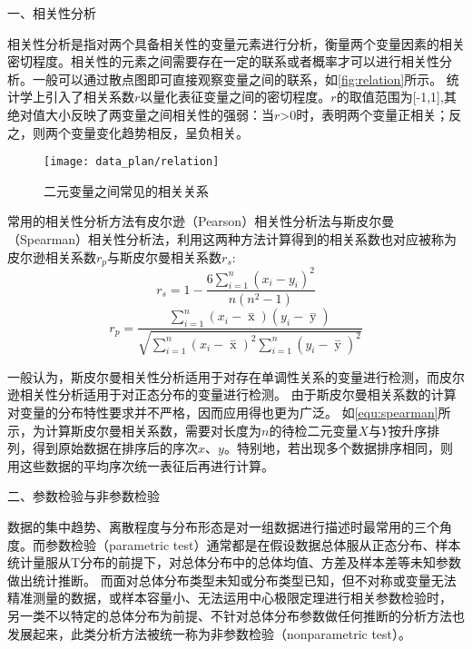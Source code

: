 一、相关性分析

相关性分析是指对两个具备相关性的变量元素进行分析，衡量两个变量因素的相关密切程度\cite{Zhang2019}。相关性的元素之间需要存在一定的联系或者概率才可以进行相关性分析。一般可以通过散点图即可直接观察变量之间的联系，如\autoref{fig:relation}所示。
统计学上引入了相关系数$r$以量化表征变量之间的密切程度。$r$的取值范围为[-1,1],其绝对值大小反映了两变量之间相关性的强弱：当$r$>0时，表明两个变量正相关；反之，则两个变量变化趋势相反，呈负相关。

\begin{figure}[htbp]
      \centering
      \texttt{[image: data\_plan/relation]}
      \caption[二元变量之间常见的相关关系]{\label{fig:relation}二元变量之间常见的相关关系\cite{IXL2022}}
\end{figure}

常用的相关性分析方法有皮尔逊（Pearson）相关性分析法与斯皮尔曼（Spearman）相关性分析法，利用这两种方法计算得到的相关系数也对应被称为皮尔逊相关系数$r_p$与斯皮尔曼相关系数$r_s$:
\begin{equation}
      \label{equ:spearman}
      r_s=1-\frac{6\sum_{i=1}^{n}(x_{i}-y_{i})^2}{n(n^2-1)}
\end{equation}
\begin{equation}
      \label{equ:pearson}
      r_p=\frac{\sum_{i=1}^n{(x_i- \mathop{x} \limits^-)(y_i- \mathop{y} \limits^-)}}{\sqrt{{\sum_{i=1}^n}{{(x_i- \mathop{x} \limits^-)^2\sum_{i=1}^n}{(y_i- \mathop{y} \limits^-)^2}}}}
\end{equation}

一般认为，斯皮尔曼相关性分析适用于对存在单调性关系的变量进行检测，而皮尔逊相关性分析适用于对正态分布的变量进行检测。
由于斯皮尔曼相关系数的计算对变量的分布特性要求并不严格，因而应用得也更为广泛。
如\autoref{equ:spearman}所示，为计算斯皮尔曼相关系数，需要对长度为$n$的待检二元变量$X$与$Y$按升序排列，得到原始数据在排序后的序次$x$、$y$。特别地，若出现多个数据排序相同，则用这些数据的平均序次统一表征后再进行计算。

二、参数检验与非参数检验

数据的集中趋势、离散程度与分布形态是对一组数据进行描述时最常用的三个角度\cite{Hu2021}。而参数检验（parametric test）通常都是在假设数据总体服从正态分布、样本统计量服从T分布的前提下，对总体分布中的总体均值、方差及样本差等未知参数做出统计推断。
而面对总体分布类型未知或分布类型已知，但不对称或变量无法精准测量的数据，或样本容量小、无法运用中心极限定理进行相关参数检验时，
另一类不以特定的总体分布为前提、不针对总体分布参数做任何推断的分析方法也发展起来，此类分析方法被统一称为非参数检验（nonparametric test）\cite{Guo2017,Hu2021,Zhang2019}。

